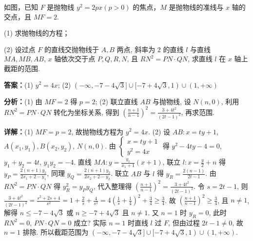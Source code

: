 \begin{question}[points=15]
如图，已知 $F$ 是抛物线 $y^2=2px (p>0)$ 的焦点，$M$ 是抛物线的准线与 $x$ 轴的交点，且 $MF=2$.

(1) 求抛物线的方程；

(2) 设过点 $F$ 的直线交抛物线于 $A,B$ 两点, 斜率为 $2$ 的直线 $l$ 与直线 $MA, MB, AB$, $x$ 轴依次交于点 $P,Q,R,N$, 且 $RN^2 = PN\cdot QN$, 求直线 $l$ 在 $x$ 轴上截距的范围.
\begin{solution}
\textbf{答案：}(1) $y^2=4x$; (2) $(-\infty, -7-4\sqrt{3}] \cup [-7+4\sqrt{3},1) \cup (1,+\infty)$

\textbf{分析：}(1) 由 $MF=2$ 得 $p=2$; (2) 联立直线 $AB$ 与抛物线, 设 $N(n,0)$, 利用 $RN^2=PN\cdot QN$ 转化为坐标关系, 得到 $\left(\frac{n+1}{n-1}\right)^2 = \frac{3+4t^2}{(2t-1)^2}$, 再求范围.

\textbf{详解：}(1) $MF = p = 2$, 故抛物线方程为 $y^2=4x$.
(2) 设 $AB: x=ty+1$, $A(x_1,y_1), B(x_2,y_2)$, $N(n,0)$. 由 $\begin{cases}x=ty+1\\ y^2=4x\end{cases}$ 得 $y^2-4ty-4=0$, $y_1+y_2=4t$, $y_1y_2=-4$. 直线 $MA: y=\frac{y_1}{x_1+1}(x+1)$, 联立 $l: x=\frac{y}{2}+n$ 得 $y_P = \frac{2(n+1)y_1}{2x_1+2-y_1}$, 同理 $y_Q = \frac{2(n+1)y_2}{2x_2+2-y_2}$. 联立 $AB$ 与 $l$ 得 $y_R = \frac{2(n-1)}{2t-1}$. 由 $RN^2=PN\cdot QN$ 得 $y_R^2 = y_P y_Q$, 代入整理得 $\left(\frac{n+1}{n-1}\right)^2 = \frac{3+4t^2}{(2t-1)^2}$. 令 $s=2t-1$, 则 $\frac{3+4t^2}{(2t-1)^2} = \frac{s^2+2s+4}{s^2} = 1+\frac{2}{s}+\frac{4}{s^2} = 4\left(\frac{1}{s}+\frac14\right)^2 + \frac34 \geq \frac34$. 故 $\left(\frac{n+1}{n-1}\right)^2 \geq \frac34$, 且 $n\neq1$, 解得 $n\leq -7-4\sqrt{3}$ 或 $n\geq -7+4\sqrt{3}$ 且 $n\neq1$. 又 $n=1$ 时 $y_R=0$, 此时 $RN^2=0$, $PN\cdot QN=0$ 成立? 实际 $n=1$ 时直线 $l$ 过 $F$, 但由过程 $2t-1\neq0$, 故 $n=1$ 排除. 所以截距范围为 $(-\infty, -7-4\sqrt{3}] \cup [-7+4\sqrt{3},1) \cup (1,+\infty)$.
\end{solution}
\end{question}

